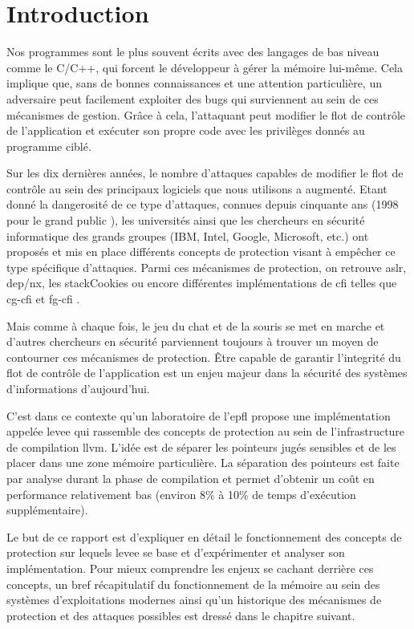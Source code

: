 \chapter{Introduction}
\label{chap:introduction}

Nos programmes sont le plus souvent écrits avec des langages de bas niveau comme le C/C++, qui forcent le développeur à gérer la mémoire lui-même. Cela implique que, sans de bonnes connaissances et une attention particulière, un adversaire peut facilement exploiter des bugs qui surviennent au sein de ces mécanismes de gestion. Grâce à cela, l’attaquant peut modifier le flot de contrôle de l'application et exécuter son propre code avec les privilèges donnés au programme ciblé.

Sur les dix dernières années, le nombre d'attaques capables de modifier le flot de contrôle au sein des principaux logiciels que nous utilisons a augmenté. Etant donné la dangerosité de ce type d’attaques, connues depuis cinquante ans (1998 pour le \og grand public \fg \cite{pharck49, SmashingTheStack}), les universités ainsi que les chercheurs en sécurité informatique des grands groupes (IBM, Intel, Google, Microsoft, etc.) ont proposés et mis en place différents concepts de protection visant à empêcher ce type spécifique d'attaques. Parmi ces mécanismes de protection, on retrouve \gls{aslr}, \gls{dep}/\gls{nx}, les \og \gls{stackCookies} \fg ou encore différentes implémentations de \og \gls{cfi} \fg telles que \og \gls{cg-cfi} \fg et \og \gls{fg-cfi} \fg.

Mais comme à chaque fois, le jeu du chat et de la souris se met en marche et d'autres chercheurs en sécurité parviennent toujours à trouver un moyen de contourner ces mécanismes de protection. Être capable de garantir l'integrité du flot de contrôle de l'application est un enjeu majeur dans la sécurité des systèmes d'informations d'aujourd'hui.

C'est dans ce contexte qu'un laboratoire de l’\gls{epfl} propose une implémentation appelée \gls{levee} qui rassemble des concepts de protection au sein de l’infrastructure de compilation \gls{llvm}. L’idée est de séparer les pointeurs jugés sensibles et de les placer dans une zone mémoire particulière. La séparation des pointeurs est faite par analyse durant la phase de compilation et permet d’obtenir un coût en performance relativement bas (environ 8\% à 10\% de temps d'exécution supplémentaire).

Le but de ce rapport est d’expliquer en détail le fonctionnement des concepts de protection sur lequels \gls{levee} se base et d’expérimenter et analyser son implémentation. Pour mieux comprendre les enjeux se cachant derrière ces concepts, un bref récapitulatif du fonctionnement de la mémoire au sein des systèmes d'exploitations modernes ainsi qu'un historique des mécanismes de protection et des attaques possibles est dressé dans le chapitre suivant.
